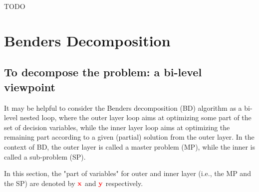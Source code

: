 \documentclass[twocolumn]{ctexart}
\begin{document}
TODO



\clearpage
\vspace{30pt}
\section{Benders Decomposition}

\subsection{To decompose the problem: a bi-level viewpoint}

It may be helpful to consider the Benders decomposition (BD) algorithm as a bi-level nested loop, where
the outer layer loop aims at optimizing some part of the set of decision variables, while
the inner layer loop aims at optimizing the remaining part according to a given (partial) solution from the outer layer.
In the context of BD,
the outer layer is called a master problem (MP), while the inner is called a sub-problem (SP).


In this section,
the "part of variables" for outer and inner layer (i.e., the MP and the SP) are denoted by $\mathbf{\color{red} x}$ and $\mathbf{\color{red} y}$ respectively.
\end{document}
